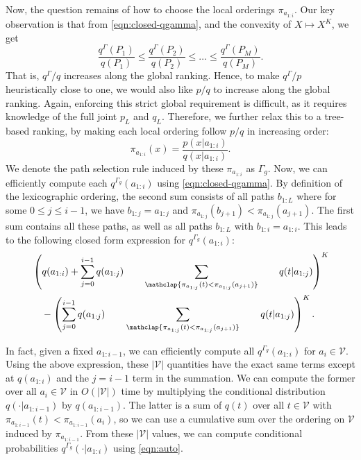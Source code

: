 \documentclass{article}
\theoremstyle{plain}
\theoremstyle{definition}
\theoremstyle{remark}
\newcommand{\V}{\mathcal{V}}
\begin{document}
Now, the question remains of how to choose the local orderings $\pi_{a_{1:i}}$. Our key observation is that from \cref{eqn:closed-qgamma}, and the convexity of $X \mapsto X^K$, we get
\begin{equation}
    \frac{q^\Gamma(P_1)}{q(P_1)} \leq \frac{q^\Gamma(P_2)}{q(P_2)} \leq \ldots \leq \frac{q^\Gamma(P_M)}{q(P_M)}.
\end{equation}
That is, $q^\Gamma/q$ increases along the global ranking. Hence, to make $q^\Gamma/p$ heuristically close to one, we would also like $p/q$ to increase along the global ranking. Again, enforcing this strict global requirement is difficult, as it requires knowledge of the full joint $p_L$ and $q_L$. Therefore, we further relax this to a tree-based ranking, by making each local ordering follow $p/q$ in increasing order:
\begin{equation}
    \pi_{a_{1:i}}(x) =\frac{p(x|a_{1:i})}{q(x|a_{1:i})}.
\end{equation}
We denote the path selection rule induced by these $\pi_{a_{1:i}}$ as $\Gamma_g$. Now, we can efficiently compute each $q^{\Gamma_g}(a_{1:i})$ using \cref{eqn:closed-qgamma}. By definition of the lexicographic ordering, the second sum consists of all paths $b_{1:L}$ where for some $0 \leq j \leq i-1$, we have $b_{1:j}=a_{1:j}$ and $\pi_{a_{1:j}}(b_{j+1}) < \pi_{a_{1:j}}(a_{j+1})$. The first sum contains all these paths, as well as all paths $b_{1:L}$ with $b_{1:i}=a_{1:i}$. This leads to the following closed form expression for $q^{\Gamma_g}(a_{1:i})$:
\begin{align}
& \left(q(a_{1:i}) + \sum_{j=0}^{i-1} q(a_{1:j})\quad \quad 
\sum_{\mathclap{\pi_{a_{1:j}}(t) < \pi_{a_{1:j}}(a_{j+1})}} \quad \quad q(t|a_{1:j}) \right)^K \\
&\quad - \left( \sum_{j=0}^{i-1} q(a_{1:j})
\quad \quad \sum_{\mathclap{\pi_{a_{1:j}}(t) < \pi_{a_{1:j}}(a_{j+1})}} \quad \quad q(t|a_{1:j}) \right)^K.
\label{eqn:compute-greedy-q}
\end{align}

In fact, given a fixed $a_{1:i-1}$, we can efficiently compute all $q^{\Gamma_g}(a_{1:i})$ for $a_{i} \in \V$. Using the above expression, these $|\V|$ quantities have the exact same terms except at $q(a_{1:i})$ and the $j=i-1$ term in the summation. We can compute the former over all $a_i \in \V$ in $O(|\V|)$ time by multiplying the conditional distribution $q(\cdot|a_{1:i-1})$ by $q(a_{1:i-1})$. The latter is a sum of $q(t)$ over all $t \in \V$ with $\pi_{a_{1:i-1}}(t)<\pi_{a_{1:i-1}}(a_i)$, so we can use a cumulative sum over the ordering on $\V$ induced by $\pi_{a_{1:i-1}}$. From these $|\V|$ values, we can compute conditional probabilities $q^{\Gamma_g}(\cdot|a_{1:i})$ using \cref{eqn:auto}. 
\end{document}
